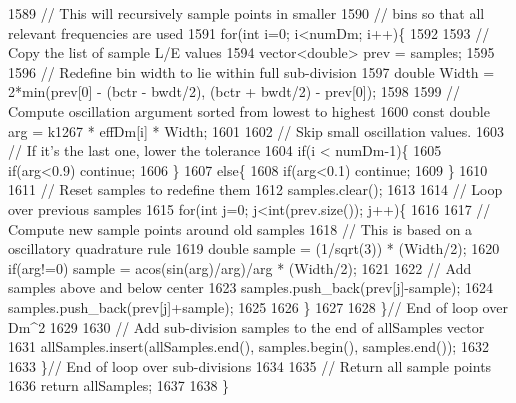 \begin{DoxyCode}
1589     \textcolor{comment}{// This will recursively sample points in smaller}
1590     \textcolor{comment}{// bins so that all relevant frequencies are used}
1591     \textcolor{keywordflow}{for}(\textcolor{keywordtype}{int} i=0; i<numDm; i++)\{
1592 
1593       \textcolor{comment}{// Copy the list of sample L/E values}
1594       vector<double> prev = samples;
1595 
1596       \textcolor{comment}{// Redefine bin width to lie within full sub-division}
1597       \textcolor{keywordtype}{double} Width = 2*min(prev[0] - (bctr - bwdt/2), (bctr + bwdt/2) - prev[0]);
1598 
1599       \textcolor{comment}{// Compute oscillation argument sorted from lowest  to highest}
1600       \textcolor{keyword}{const} \textcolor{keywordtype}{double} arg = k1267 * effDm[i] * Width;
1601 
1602       \textcolor{comment}{// Skip small oscillation values.}
1603       \textcolor{comment}{// If it's the last one, lower the tolerance}
1604       \textcolor{keywordflow}{if}(i < numDm-1)\{
1605         \textcolor{keywordflow}{if}(arg<0.9) \textcolor{keywordflow}{continue};
1606       \}
1607       \textcolor{keywordflow}{else}\{
1608         \textcolor{keywordflow}{if}(arg<0.1) \textcolor{keywordflow}{continue};
1609       \}
1610 
1611       \textcolor{comment}{// Reset samples to redefine them}
1612       samples.clear();
1613 
1614       \textcolor{comment}{// Loop over previous samples}
1615       \textcolor{keywordflow}{for}(\textcolor{keywordtype}{int} j=0; j<int(prev.size()); j++)\{
1616 
1617         \textcolor{comment}{// Compute new sample points around old samples}
1618         \textcolor{comment}{// This is based on a oscillatory quadrature rule}
1619         \textcolor{keywordtype}{double} sample = (1/sqrt(3)) * (Width/2);
1620         \textcolor{keywordflow}{if}(arg!=0) sample = acos(sin(arg)/arg)/arg * (Width/2);
1621 
1622         \textcolor{comment}{// Add samples above and below center}
1623         samples.push\_back(prev[j]-sample);
1624         samples.push\_back(prev[j]+sample);
1625 
1626       \}
1627 
1628     \}\textcolor{comment}{// End of loop over Dm^2}
1629 
1630     \textcolor{comment}{// Add sub-division samples to the end of allSamples vector}
1631     allSamples.insert(allSamples.end(), samples.begin(), samples.end());
1632 
1633   \}\textcolor{comment}{// End of loop over sub-divisions}
1634 
1635   \textcolor{comment}{// Return all sample points}
1636   \textcolor{keywordflow}{return} allSamples;
1637 
1638 \}
\end{DoxyCode}
\mbox{\label{classOscProb_1_1PMNS__Base_adf23b569112f9f9e0e592f01d79a5f3d}} 
